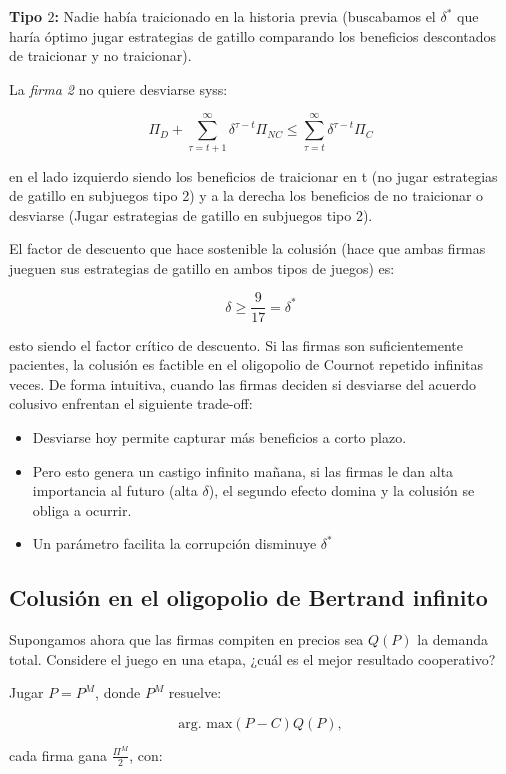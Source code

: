 \documentclass[letterpaper,12pt,twocolumn]{report}
\begin{document}
\textbf{Tipo $2$:} Nadie había traicionado en la historia previa (buscabamos el $\delta^*$ que haría óptimo jugar estrategias de gatillo comparando los beneficios descontados de traicionar y no traicionar).

La \textit{firma 2} no quiere desviarse syss:

$$ \Pi_D + \sum_{\tau=t+1}^{\infty}\delta^{\tau-t}\Pi_{NC}\leq\sum_{\tau=t}^{\infty}\delta^{\tau-t}\Pi_C $$

en el lado izquierdo siendo los beneficios de traicionar en t (no jugar estrategias de gatillo en subjuegos tipo 2) y a la derecha los beneficios de no traicionar o desviarse (Jugar estrategias de gatillo en subjuegos tipo 2).

El factor de descuento que hace sostenible la colusión (hace que ambas firmas jueguen sus estrategias de gatillo en ambos tipos de juegos) es:

$$ \delta\geq \dfrac{9}{17} = \delta^* $$

esto siendo el factor crítico de descuento. Si las firmas son suficientemente pacientes, la colusión es factible en el oligopolio de Cournot repetido infinitas veces. De forma intuitiva, cuando las firmas deciden si desviarse del acuerdo colusivo enfrentan el siguiente trade-off:

\begin{itemize}
	\item Desviarse hoy permite capturar más beneficios a corto plazo.
	\item Pero esto genera un castigo infinito mañana, si las firmas le dan alta importancia al futuro (alta $\delta$), el segundo efecto domina y la colusión se obliga a ocurrir.
	\item Un parámetro facilita la corrupción disminuye $\delta^*$
\end{itemize}

\subsection*{Colusión en el oligopolio de Bertrand infinito}

Supongamos ahora que las firmas compiten en precios sea $Q(P)$ la demanda total. Considere el juego en una etapa, ¿cuál es el mejor resultado cooperativo?

Jugar $P=P^M$, donde $P^M$ resuelve:

$$ \text{arg. max} (P-C)Q(P),$$

cada firma gana $\frac{\Pi^M}{2}$, con:
\end{document}
